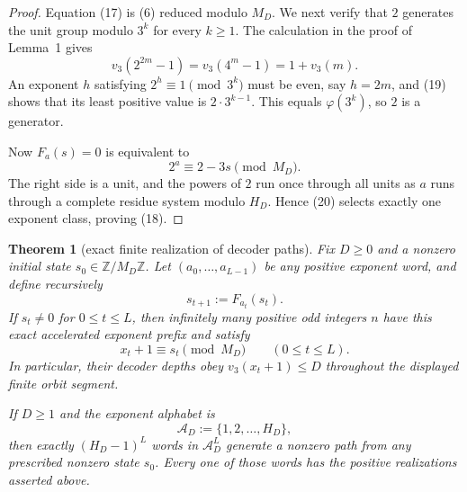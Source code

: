 \documentclass[11pt]{article}
\newtheorem{theorem}{Theorem}
\begin{document}
\begin{proof}
Equation (17) is (6) reduced modulo $M_D$.  We next verify that $2$ generates
the unit group modulo $3^k$ for every $k\geq1$.  The calculation in the proof
of Lemma~1 gives
\[
  v_3(2^{2m}-1)=v_3(4^m-1)=1+v_3(m).
  \tag{19}
\]
An exponent $h$ satisfying $2^h\equiv1\pmod {3^k}$ must be even, say
$h=2m$, and (19) shows that its least positive value is
$2\cdot3^{k-1}$.  This equals $\varphi(3^k)$, so $2$ is a generator.

Now $F_a(s)=0$ is equivalent to
\[
  2^a\equiv2-3s\pmod {M_D}.
  \tag{20}
\]
The right side is a unit, and the powers of $2$ run once through all units as
$a$ runs through a complete residue system modulo $H_D$.  Hence (20) selects
exactly one exponent class, proving (18).
\end{proof}

\begin{theorem}[exact finite realization of decoder paths]
Fix $D\geq0$ and a nonzero initial state
$s_0\in\mathbb Z/M_D\mathbb Z$.  Let
$(a_0,\ldots,a_{L-1})$ be any positive exponent word, and define
recursively
\[
  s_{t+1}:=F_{a_t}(s_t).
  \tag{21}
\]
If $s_t\neq0$ for $0\leq t\leq L$, then infinitely many positive odd
integers $n$ have this exact accelerated exponent prefix and satisfy
\[
  x_t+1\equiv s_t\pmod {M_D}
  \qquad(0\leq t\leq L).
  \tag{22}
\]
In particular, their decoder depths obey $v_3(x_t+1)\leq D$ throughout the
displayed finite orbit segment.

If $D\geq1$ and the exponent alphabet is
\[
  \mathcal A_D:=\{1,2,\ldots,H_D\},
  \tag{23}
\]
then exactly $(H_D-1)^L$ words in $\mathcal A_D^L$ generate a nonzero path
from any prescribed nonzero state $s_0$.  Every one of those words has the
positive realizations asserted above.
\end{theorem}
\end{document}
